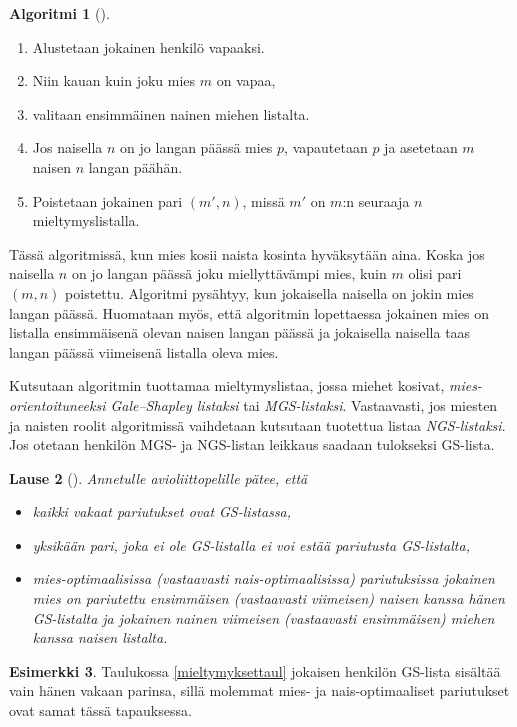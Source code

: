 \documentclass[finnish]{tktltiki2}
\newtheorem{lau}{Lause}
\theoremstyle{definition}
\newtheorem{alg}[lau]{Algoritmi}
\newtheorem{esim}[lau]{Esimerkki}
\theoremstyle{remark}
\begin{document}
\begin{alg}[\cite{gusfield1989stable}]\label{alg2}
	\begin{enumerate}
		\item Alustetaan jokainen henkilö vapaaksi.
		\item Niin kauan kuin joku mies $m$ on vapaa,
		\item valitaan ensimmäinen nainen miehen listalta.
		\item Jos naisella $n$ on jo langan päässä mies $p$, vapautetaan $p$ ja asetetaan $m$ naisen $n$ langan päähän.
		\item Poistetaan jokainen pari $(m', n)$, missä $m'$ on $m$:n seuraaja $n$ mieltymyslistalla.
	\end{enumerate}
\end{alg}

Tässä algoritmissä, kun mies kosii naista kosinta hyväksytään aina. Koska jos naisella $n$ on jo langan päässä joku miellyttävämpi mies, kuin $m$ olisi pari $(m, n)$ poistettu.
Algoritmi pysähtyy, kun jokaisella naisella on jokin mies langan päässä. Huomataan myös, että algoritmin lopettaessa jokainen mies on listalla ensimmäisenä olevan naisen langan päässä ja jokaisella naisella taas langan päässä viimeisenä listalla oleva mies.

Kutsutaan algoritmin tuottamaa mieltymyslistaa, jossa miehet kosivat, \emph{mies-orientoituneeksi Gale--Shapley listaksi} tai \emph{MGS-listaksi}. Vastaavasti, jos miesten ja naisten roolit algoritmissä vaihdetaan kutsutaan tuotettua listaa \emph{NGS-listaksi}. Jos otetaan henkilön MGS- ja NGS-listan leikkaus saadaan tulokseksi GS-lista.

\begin{lau}[\cite{gusfield1989stable}]\label{laajlause}
	Annetulle avioliittopelille pätee, että
	\begin{itemize}
		\item kaikki vakaat pariutukset ovat GS-listassa,
		\item yksikään pari, joka ei ole GS-listalla ei voi estää pariutusta GS-listalta,
		\item mies-optimaalisissa (vastaavasti nais-optimaalisissa) pariutuksissa jokainen mies on pariutettu ensimmäisen (vastaavasti viimeisen) naisen kanssa hänen GS-listalta ja jokainen nainen viimeisen (vastaavasti ensimmäisen) miehen kanssa naisen listalta.
	\end{itemize}
\end{lau}

\begin{esim}
	Taulukossa \ref{mieltymyksettaul} jokaisen henkilön GS-lista sisältää vain hänen vakaan parinsa, sillä molemmat mies- ja nais-optimaaliset pariutukset ovat samat tässä tapauksessa.
\end{esim}
\end{document}
